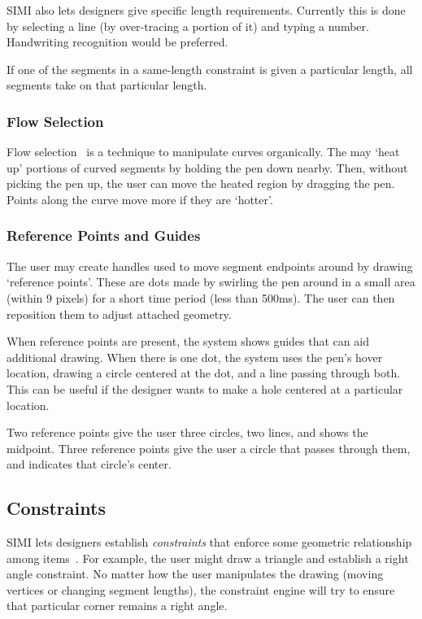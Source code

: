 \documentclass{article}
\begin{document}
SIMI also lets designers give specific length requirements. Currently
this is done by selecting a line (by over-tracing a portion of it) and
typing a number. Handwriting recognition would be preferred.

If one of the segments in a same-length constraint is given a
particular length, all segments take on that particular length.

\subsubsection{Flow Selection}

Flow selection~\cite{johnson-flow-selection} is a technique to
manipulate curves organically. The may `heat up' portions of curved
segments by holding the pen down nearby. Then, without picking the pen
up, the user can move the heated region by dragging the pen. Points
along the curve move more if they are `hotter'.

\subsubsection{Reference Points and Guides}

The user may create handles used to move segment endpoints around by
drawing `reference points'. These are dots made by swirling the pen
around in a small area (within 9 pixels) for a short time period (less
than 500ms). The user can then reposition them to adjust attached
geometry.

When reference points are present, the system shows guides that can
aid additional drawing. When there is one dot, the system uses the
pen's hover location, drawing a circle centered at the dot, and a line
passing through both. This can be useful if the designer wants to make
a hole centered at a particular location.

Two reference points give the user three circles, two lines, and shows
the midpoint. Three reference points give the user a circle that
passes through them, and indicates that circle's center.

\subsection{Constraints}

SIMI lets designers establish \textit{constraints} that enforce some
geometric relationship among items~\cite{borning-thinglab}. For
example, the user might draw a triangle and establish a right angle
constraint. No matter how the user manipulates the drawing (moving
vertices or changing segment lengths), the constraint engine will try
to ensure that particular corner remains a right angle.
\end{document}
